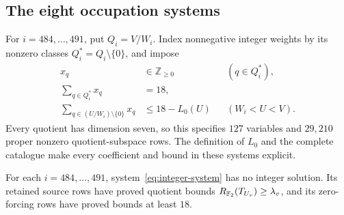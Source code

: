 \subsection{The eight occupation systems}
For $i=484,\ldots,491$, put $Q_i=V/W_i$. Index nonnegative
integer weights by its nonzero classes $Q_i^*=Q_i\setminus\{0\}$,
and impose
\begin{equation}\label{eq:integer-system}
 \begin{aligned}
 x_q&\in\mathbb Z_{\geq0} &&(q\in Q_i^*),\\
 \sum_{q\in Q_i^*}x_q&=18,\\
 \sum_{q\in(U/W_i)\setminus\{0\}}x_q
       &\leq18-L_0(U) &&(W_i<U<V).
 \end{aligned}
\end{equation}
Every quotient has dimension seven, so this specifies $127$ variables
and $29{,}210$ proper nonzero quotient-subspace rows. The definition of
$L_0$ and the complete catalogue make every coefficient and bound in
these systems explicit.

\begin{proposition}\label{prop:integer}
For each $i=484,\ldots,491$, system~\eqref{eq:integer-system}
has no integer solution. Its retained source rows have proved
quotient bounds $R_{\mathbb F_2}(T_{U_v})\geq\lambda_v$, and its
zero-forcing rows have proved bounds at least $18$.
\end{proposition}

